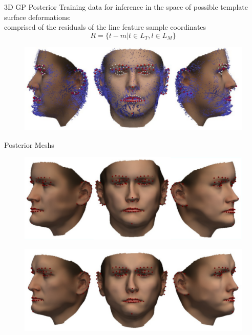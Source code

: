 \documentclass[xcolor=x11names,compress]{beamer}
\begin{document}
\begin{frame}{3D GP Posterior}
Training data for inference in the space of possible template surface deformations:\\
comprised of the residuals of the line feature sample coordinates        
\begin{equation*}
R = \{t - m \vert t \in L_{T}, l \in L_{M}\} 
\end{equation*}
\begin{figure}   
\centering
\includegraphics[width=.8\textwidth]{../resources/img/posterior_deformations.pdf}
\end{figure}

\end{frame}

\begin{frame}{Posterior Meshs}
    \begin{figure}
        \centering
        \includegraphics[width=.9\textwidth]{../resources/img/posterior_sample_17.pdf}
    \end{figure}
    \begin{figure}
        \centering
        \includegraphics[width=.9\textwidth]{../resources/img/posterior_sample_23.pdf}
    \end{figure}
\end{frame}
\end{document}

